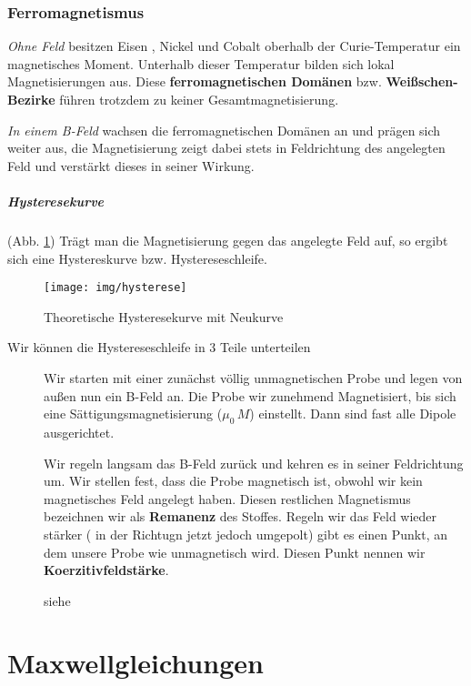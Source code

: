 \subsubsection{Ferromagnetismus}
\textit{Ohne Feld} besitzen Eisen , Nickel und Cobalt oberhalb der Curie-Temperatur ein magnetisches Moment. Unterhalb dieser Temperatur bilden sich lokal Magnetisierungen aus. Diese \textbf{ferromagnetischen Domänen} bzw. \textbf{Weißschen-Bezirke} führen trotzdem zu keiner Gesamtmagnetisierung.

\textit{In einem B-Feld} wachsen die ferromagnetischen Domänen an und prägen sich weiter aus, die Magnetisierung zeigt dabei stets in Feldrichtung des angelegten Feld und verstärkt dieses in seiner Wirkung.
\subparagraph{Hysteresekurve}(Abb. \ref{pic:Hysterese})
Trägt man die Magnetisierung gegen das angelegte Feld auf,  so ergibt sich eine Hystereskurve bzw. Hystereseschleife.
\begin{figure}\begin{center}
\texttt{[image: img/hysterese]}\end{center}
\caption{Theoretische Hysteresekurve mit Neukurve }
\label{pic:Hysterese}
\end{figure}

Wir können die Hystereseschleife in 3 Teile unterteilen
\begin{description}
\item[] Wir starten mit einer zunächst völlig unmagnetischen Probe und legen von außen nun ein B-Feld an. Die Probe wir zunehmend Magnetisiert, bis sich eine Sättigungsmagnetisierung ($\mu_0  \, M$) einstellt. Dann sind fast alle Dipole ausgerichtet.

\item[] Wir regeln langsam das B-Feld zurück und kehren es in seiner Feldrichtung um. Wir stellen fest, dass die Probe magnetisch ist, obwohl wir kein magnetisches Feld angelegt haben. Diesen restlichen Magnetismus  bezeichnen wir als \textbf{Remanenz} des Stoffes. Regeln wir das Feld wieder stärker ( in der Richtugn jetzt jedoch umgepolt) gibt es einen Punkt, an dem unsere Probe wie unmagnetisch wird. Diesen Punkt nennen wir  \textbf{Koerzitivfeldstärke}.
\item[] siehe 
\end{description}




\section{Maxwellgleichungen}
